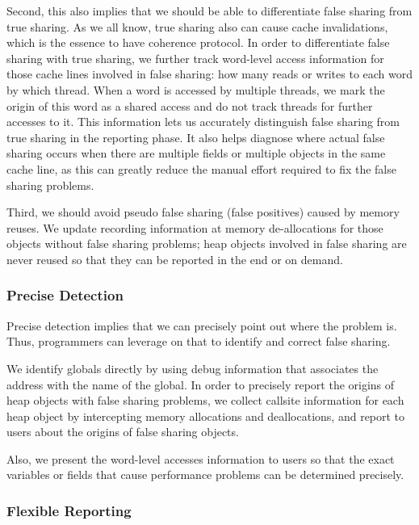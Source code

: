 Second, this also implies that we should be able to differentiate false sharing from true sharing. As we all know, true sharing also can cause cache invalidations, which is the essence to have coherence protocol. In order to differentiate false sharing with true sharing, we further  track word-level access information for those cache lines involved in false sharing: how many reads or writes to each word by which thread. When a word is accessed by multiple threads, we mark the origin of this word as a shared access and do not track threads for further accesses to it. This information lets us accurately distinguish false sharing from true sharing in the reporting phase. It also helps diagnose where actual false sharing occurs when there are multiple fields or multiple objects in the same cache line, as this can greatly reduce the manual effort required to fix the false sharing problems.
  
Third, we should avoid pseudo false sharing (false positives) caused by memory reuses.  We update recording information at memory de-allocations for those objects without false sharing problems; heap objects involved in false sharing are never reused so that they can be reported in the end or on demand. 

\subsubsection{Precise Detection}
\label{sec:precisedetect}

Precise detection implies that we can precisely point out where the problem is. Thus, programmers can leverage on that to identify and correct false sharing. 

We identify globals directly by using debug information that associates the address with the name of the global. In order to precisely report the origins of heap objects with false sharing problems, we collect callsite information for each heap object by intercepting memory allocations and deallocations, and report to users about the origins of false sharing objects. 

Also, we present the word-level accesses information to users so that the exact variables or fields that cause performance problems can be determined precisely. 

\subsubsection{Flexible Reporting}
\label{sec:flexiblereport}

